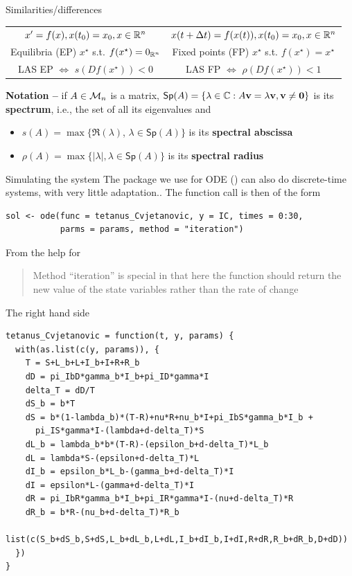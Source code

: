 \documentclass[aspectratio=169]{beamer}
\begin{document}
\begin{frame}{Similarities/differences}
  \begin{center}
    \renewcommand{\arraystretch}{1.5}
    \begin{tabular}{cc}
      $x'=f(x), x(t_0)=x_0, x\in\mathbb{R}^n$
      &
      $x(t+\Delta t)=f(x(t)), x(t_0)=x_0, x\in\mathbb{R}^n$ \\
      Equilibria (EP) $x^\star$ s.t. $f(x^\star)=0_{\mathbb{R}^n}$ 
      &
      Fixed points (FP) $x^\star$ s.t. $f(x^\star)=x^\star$ \\
      LAS EP $\Leftrightarrow$ $s(Df(x^\star))<0$
      &
      LAS FP $\Leftrightarrow$ $\rho(Df(x^\star))<1$ \\
      
    \end{tabular}    
  \end{center}
  \vfill
  \textbf{Notation --} 
  if $A\in\mathcal{M}_n$ is a matrix, $\mathsf{Sp}(A)=\{\lambda\in\IC: A\bv=\lambda\bv,\bv\neq\b0\}$ is its \textbf{spectrum}, i.e., the set of all its eigenvalues and
  \begin{itemize}
    \item $s(A)=\max\{\Re(\lambda)$, $\lambda\in\mathsf{Sp}(A)\}$ is its \textbf{spectral abscissa}
    \item $\rho(A)=\max\{|\lambda|,\lambda\in\mathsf{Sp}(A)\}$ is its \textbf{spectral radius}
  \end{itemize}
\end{frame}


\begin{frame}[fragile]{Simulating the system}
The  package we use for ODE () can also do discrete-time systems, with very little adaptation.. 
\vfill
The function call is then of the form 
\begin{lstlisting}
sol <- ode(func = tetanus_Cvjetanovic, y = IC, times = 0:30, 
           parms = params, method = "iteration")
\end{lstlisting}
\vfill
From the help for 
\begin{quote}
  Method ``iteration'' is special in that here the function  should return the new value of the state variables rather than the rate of change
\end{quote}
\end{frame}

\begin{frame}[fragile]{The right hand side}
\begin{lstlisting}
tetanus_Cvjetanovic = function(t, y, params) {
  with(as.list(c(y, params)), {
    T = S+L_b+L+I_b+I+R+R_b
    dD = pi_IbD*gamma_b*I_b+pi_ID*gamma*I
    delta_T = dD/T
    dS_b = b*T
    dS = b*(1-lambda_b)*(T-R)+nu*R+nu_b*I+pi_IbS*gamma_b*I_b +
      pi_IS*gamma*I-(lambda+d-delta_T)*S
    dL_b = lambda_b*b*(T-R)-(epsilon_b+d-delta_T)*L_b
    dL = lambda*S-(epsilon+d-delta_T)*L
    dI_b = epsilon_b*L_b-(gamma_b+d-delta_T)*I
    dI = epsilon*L-(gamma+d-delta_T)*I
    dR = pi_IbR*gamma_b*I_b+pi_IR*gamma*I-(nu+d-delta_T)*R
    dR_b = b*R-(nu_b+d-delta_T)*R_b
    list(c(S_b+dS_b,S+dS,L_b+dL_b,L+dL,I_b+dI_b,I+dI,R+dR,R_b+dR_b,D+dD))
  })
}
\end{lstlisting}
\end{frame}
\end{document}
